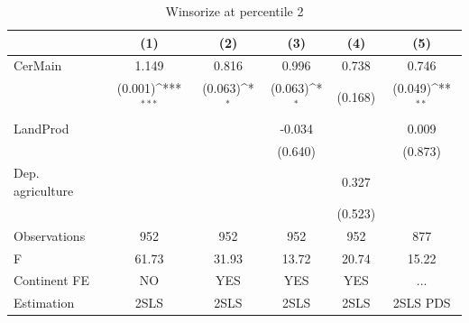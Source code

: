\begin{table}[htbp]\centering
\def\sym#1{\ifmmode^{#1}\else\(^{#1}\)\fi}
\caption{Winsorize at percentile 2}
\begin{tabular}{l*{5}{c}}
\hline\hline
                &\multicolumn{1}{c}{(1)}         &\multicolumn{1}{c}{(2)}         &\multicolumn{1}{c}{(3)}         &\multicolumn{1}{c}{(4)}         &\multicolumn{1}{c}{(5)}         \\
\hline
CerMain         &    1.149         &    0.816         &    0.996         &    0.738         &    0.746         \\
                &  (0.001)\sym{***}&  (0.063)\sym{*}  &  (0.063)\sym{*}  &  (0.168)         &  (0.049)\sym{**} \\
LandProd        &                  &                  &   -0.034         &                  &    0.009         \\
                &                  &                  &  (0.640)         &                  &  (0.873)         \\
Dep. agriculture&                  &                  &                  &    0.327         &                  \\
                &                  &                  &                  &  (0.523)         &                  \\
\hline
Observations    &      952         &      952         &      952         &      952         &      877         \\
F               &    61.73         &    31.93         &    13.72         &    20.74         &    15.22         \\
Continent FE    &       NO         &      YES         &      YES         &      YES         &      ...         \\
Estimation      &     2SLS         &     2SLS         &     2SLS         &     2SLS         & 2SLS PDS         \\
\hline\hline
\end{tabular}
\end{table}
